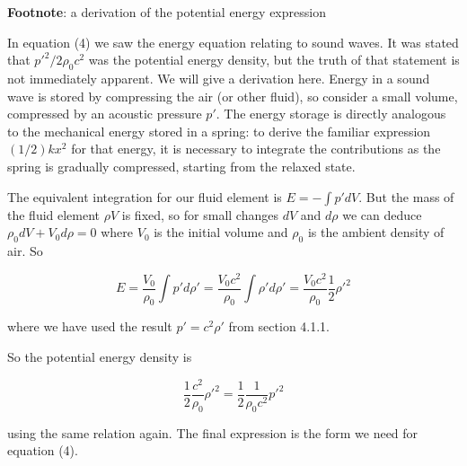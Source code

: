   \textbf{Footnote}: a derivation of the potential energy expression 

  In equation (4) we saw the energy equation relating to sound waves. It was 
  stated that $p'^2/2\rho_0c^2$ was the potential energy density, but the truth 
  of that statement is not immediately apparent. We will give a derivation 
  here. Energy in a sound wave is stored by compressing the air (or other 
  fluid), so consider a small volume, compressed by an acoustic pressure $p'$. 
  The energy storage is directly analogous to the mechanical energy stored in a 
  spring: to derive the familiar expression $(1/2)kx^2$ for that energy, it is 
  necessary to integrate the contributions as the spring is gradually 
  compressed, starting from the relaxed state. 

  The equivalent integration for our fluid element is $E=-\int{p' dV}$. But the 
  mass of the fluid element $\rho V$ is fixed, so for small changes $dV$ and $d 
  \rho$ we can deduce $\rho_0 dV + V_0 d\rho =0$ where $V_0$ is the initial 
  volume and $\rho_0$ is the ambient density of air. So 

  $$E=\dfrac{V_0}{\rho_0}\int{p' d\rho'}=\dfrac{V_0 c^2}{\rho_0}\int{\rho' 
  d\rho'}=\dfrac{V_0 c^2}{\rho_0}\dfrac{1}{2}\rho'^2 \tag{15}$$ 

  where we have used the result $p'=c^2 \rho'$ from section 4.1.1. 

  So the potential energy density is 

  $$\dfrac{1}{2}\dfrac{c^2}{\rho_0}\rho'^2 = \dfrac{1}{2}\dfrac{1}{\rho_0 
  c^2}p'^2 \tag{16}$$ 

  using the same relation again. The final expression is the form we need for 
  equation (4). 